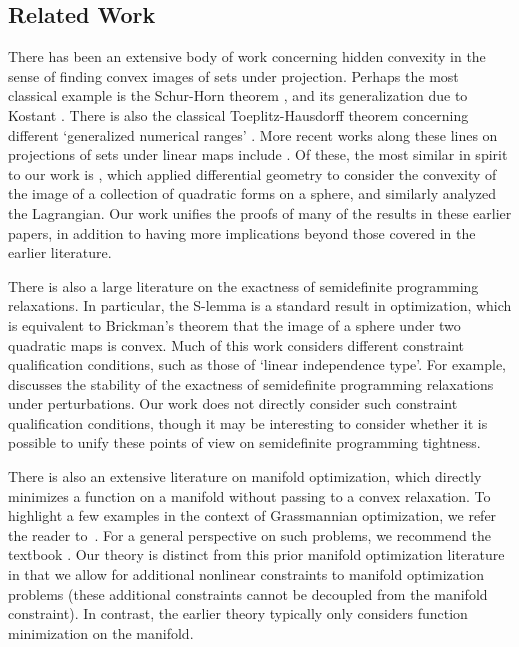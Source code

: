\documentclass{article}
\numberwithin{equation}{section}
\begin{document}
\subsection{Related Work}
There has been an extensive body of work concerning hidden convexity in the sense of finding convex images of sets under projection. Perhaps the most classical example is the Schur-Horn theorem \cite{schur1914zwei, horn1954doubly}, and its generalization due to Kostant \cite{kostant1973convexity}. There is also the classical Toeplitz-Hausdorff theorem concerning different `generalized numerical ranges' \cite{toeplitz1918algebraische, hausdorff1919wertvorrat, davis1971toeplitz}. More recent works along these lines on projections of sets under linear maps include \cite{brickman1961field,binding1985hermitian,gutkin2004convexity, au1983extension, au1984some, li2000numerical, song2024linear}. Of these, the most similar in spirit to our work is \cite{gutkin2004convexity}, which applied differential geometry to consider the convexity of the image of a collection of quadratic forms on a sphere, and similarly analyzed the Lagrangian. Our work unifies the proofs of many of the results in these earlier papers, in addition to having more implications beyond those covered in the earlier literature.

There is also a large literature on the exactness of semidefinite programming relaxations. In particular, the S-lemma is a standard result in optimization, which is equivalent to Brickman's theorem that the image of a sphere under two quadratic maps is convex. Much of this work considers different constraint qualification conditions, such as those of `linear independence type'. For example, \cite{cifuentes2022local} discusses the stability of the exactness of semidefinite programming relaxations under perturbations. Our work does not directly consider such constraint qualification conditions, though it may be interesting to consider whether it is possible to unify these points of view on semidefinite programming tightness.

There is also an extensive literature on manifold optimization, which directly minimizes a function on a manifold without passing to a convex relaxation. To highlight a few examples in the context of Grassmannian optimization, we refer the reader to~\cite{EGNS2021-gro,LLY2025-gro,YWL2022-gro,LWY2021-gro}. For a general perspective on such problems, we  recommend the textbook \cite{boumal}.  Our theory is distinct from this prior manifold optimization literature in that we allow for additional nonlinear constraints to manifold optimization problems (these additional constraints cannot be decoupled from the manifold constraint).  In contrast, the earlier theory typically only considers function minimization on the manifold.
\end{document}
